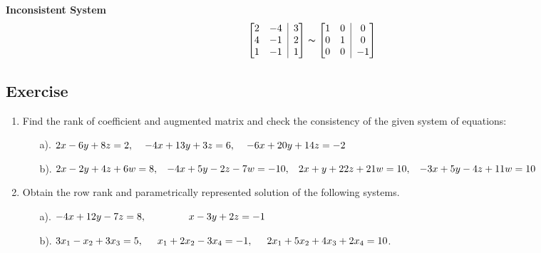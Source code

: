 \documentclass[math101_lecturenotes_ku.tex]{subfiles}
\begin{document}
  \textbf{Inconsistent System}
$$ \left[ \begin{matrix}
    2 & -4  \\
    4 & -1 \\
    1 & -1  \\
\end{matrix} \;\; \vline \;\;
\begin{matrix}
    3\\ 2\\ 1
\end{matrix} \right] \thicksim  \left[ \begin{matrix}
    1 & 0  \\
    0 & 1  \\
    0 & 0
\end{matrix} \;\; \vline \;\;
\begin{matrix}
    0\\ 0\\ -1
\end{matrix} \right]$$

\subsection{Exercise}
\begin{enumerate}
\item Find the rank of coefficient and augmented matrix and check the consistency of the given system of equations:
  \begin{enumerate}
  \item[a).]   \( \displaystyle 2x-6y+8z = 2, \hspace{4mm}  -4x+13y+3z = 6, \hspace{4mm} -6x+20y+14z = -2\)
  \item[b).] \( 2x-2y+4z+6w=8, \hspace{3mm} -4x+5y-2z-7w=-10, \hspace{3mm} 2x+y+22z+21w=10, \hspace{3mm} -3x+5y-4z+11w=10\)
  \end{enumerate}



\item Obtain the row rank and parametrically represented solution of the following systems.
  \begin{enumerate}
  \item[a).] \(\displaystyle -4x+12y-7z=8, \hspace{15mm} x-3y+2z=-1\)
   \item[b).] \(\displaystyle 3x_1-x_2+3x_3=5, \hspace{5mm} x_1+2x_2-3x_4=-1, \hspace{5mm} 2x_1+5x_2+4x_3+2x_4 = 10\).
  \end{enumerate}
\end{enumerate}
\end{document}
